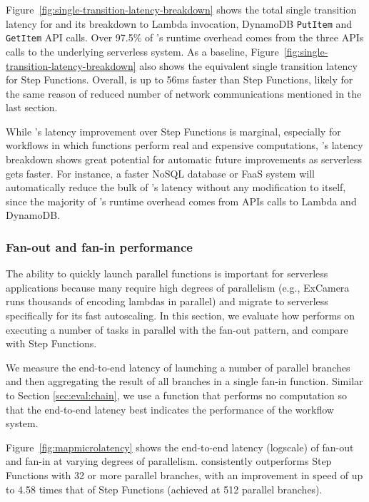 Figure~\ref{fig:single-transition-latency-breakdown} shows the total single
transition latency for \name{} and its breakdown to Lambda invocation,
DynamoDB \texttt{PutItem} and \texttt{GetItem} API calls. Over 97.5\% of
\name{}'s runtime overhead comes from the three APIs calls to the underlying
serverless system. As a baseline,
Figure~\ref{fig:single-transition-latency-breakdown} also shows the equivalent
single transition latency for Step Functions. Overall, \name{} is up to 56ms
faster than Step Functions, likely for the same reason of reduced number of
network communications mentioned in the last section.

While \name{}'s latency improvement over Step Functions is marginal,
especially for workflows in which functions perform real and expensive
computations, \name{}'s latency breakdown shows great potential for automatic
future improvements as serverless gets faster. For instance, a
faster NoSQL database or FaaS system will automatically reduce the bulk of
\name{}'s latency without any modification to \name{} itself, since the majority of
\name{}'s runtime overhead comes from APIs calls to Lambda and DynamoDB.

\subsubsection{Fan-out and fan-in performance}\label{sec:eval:fan-out}

The ability to quickly launch parallel functions is important for serverless
applications because many require high degrees of parallelism (e.g., ExCamera
runs thousands of encoding lambdas in parallel) and migrate to serverless
specifically for its fast autoscaling. In this section, we evaluate how
\name{} performs on executing a number of tasks in parallel with the fan-out
pattern, and compare with Step Functions.

We measure the end-to-end latency of launching a number of parallel branches
and then aggregating the result of all branches in a single fan-in function.
Similar to Section \ref{sec:eval:chain}, we use a function that performs no
computation so that the end-to-end latency best indicates the performance of
the workflow system.


Figure~\ref{fig:mapmicrolatency} shows the end-to-end latency (logscale) of
fan-out and fan-in at varying degrees of parallelism. \name{} consistently
outperforms Step Functions with 32 or more parallel branches, with an
improvement in speed of up to 4.58 times that of Step Functions (achieved at
512 parallel branches).

